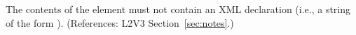 The contents of the  element must not contain an XML
declaration (i.e., a string of the form ).  (References: L2V3 Section~\ref{sec:notes}.)
